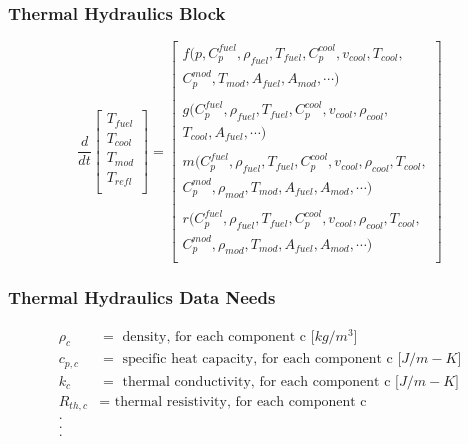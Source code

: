 \begin{frame}[fragile]
  \frametitle{Thermal Hydraulics Block}
  \footnotesize{
  \begin{equation} 
  \frac{d}{dt}\left[
    \begin{array}{c}
      T_{fuel} \\
      T_{cool} \\
      T_{mod} \\
      T_{refl} \\
    \end{array}
    \right]
    =
    \left[
      \begin{array}{ r }
        f(p, C_p^{fuel}, \rho_{fuel}, T_{fuel}, C_p^{cool}, v_{cool}, T_{cool},\\ 
          C_p^{mod}, T_{mod}, A_{fuel}, A_{mod}, \cdots )\\
          \\
        g(C_p^{fuel}, \rho_{fuel}, T_{fuel}, C_p^{cool}, v_{cool}, \rho_{cool},\\
          T_{cool}, A_{fuel}, \cdots )\\
          \\
        m(C_p^{fuel}, \rho_{fuel}, T_{fuel}, C_p^{cool}, v_{cool}, \rho_{cool},T_{cool},\\
         C_p^{mod}, \rho_{mod}, T_{mod}, A_{fuel}, A_{mod}, \cdots )\\
        \\
        r(C_p^{fuel}, \rho_{fuel}, T_{fuel}, C_p^{cool}, v_{cool}, \rho_{cool}, T_{cool},\\
         C_p^{mod}, \rho_{mod}, T_{mod}, A_{fuel}, A_{mod}, \cdots )\\
      \end{array}
      \right]
      \label{eqn:th_prke_fuller}
    \end{equation}
  
  }
\end{frame}



\begin{frame}[fragile]
  \frametitle{Thermal Hydraulics Data Needs}
\footnotesize{
  \begin{align} 
    \rho_{c} &= \mbox{ density, for each component c [$kg/m^3$]}\\
    c_{p,c} &= \mbox{ specific heat capacity, for each component c [$J/m-K$]}\\
    k_{c} &= \mbox{ thermal conductivity, for each component c [$J/m-K$]}\\
    R_{th,c} &= \mbox{ thermal resistivity, for each component c }\\
    . &\\\nonumber
    . &\\\nonumber
    . &\nonumber
  \end{align}
}
\end{frame}


